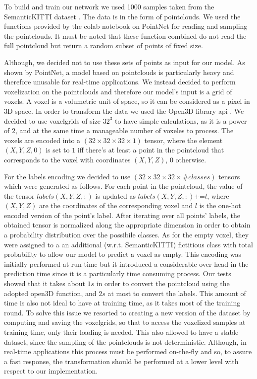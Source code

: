 To build and train our network we used 1000 samples taken from the SemanticKITTI dataset \cite{behley2019iccv}.
The data is in the form of pointclouds. We used the
functions provided by the colab notebook on PointNet for reading and sampling the pointclouds. It must be noted that these function combined
do not read the full pointcloud but return a random subset of points of fixed size.\par
Although, we decided not to use these sets of points as input for our model. As shown by PointNet,
a model based on pointclouds is particularly heavy and therefore unusable for real-time applications.
We instead decided to perform voxelization on the pointclouds and therefore our model's input is a grid of voxels.
A voxel is a volumetric unit of space, so it can be considered as a pixel in 3D space.
In order to transform the data we used the Open3D library api \cite{zhou2018open3d}. 
We decided to use voxelgrids of size $32^3$ to have simple calculations, as it is a power of $2$, and at the same time a manageable number of voxeles to process.
The voxels are encoded into a $(32\times32\times32\times1)$ tensor, where the element $(X,Y,Z,0)$ is set to $1$ iff there's at least a point in the pointcloud that corresponds to the voxel with coordinates $(X,Y,Z)$, 0 otherwise.\par
For the labels encoding we decided to use $(32\times32\times32\times\#classes)$ tensors which were generated as follows.
For each point in the pointcloud, the value of the tensor 
$labels(X,Y,Z,:)$ is updated as $labels(X,Y,Z,:)\textrm{+=}l$, where $(X,Y,Z)$ are the coordinates of the corresponding voxel and $l$ is the one-hot encoded version
of the point's label.
After iterating over all points' labels, the obtained tensor is normalized along the appropriate dimension in order to obtain a probability distribution over the possibile classes. 
As for the empty voxel, they were assigned to a an additional (w.r.t. SemanticKITTI) fictitious class with total probability to 
allow our model to predict a voxel as empty.
This encoding was initially performed at run-time but it introduced a considerable over-head in the prediction time since
it is a particularly time consuming process. Our tests showed that it takes about $1s$ in order to convert the pointcloud
using the adopted open3D function, and $2s$ at most to convert the labels. This amount of time
is also not ideal to have at training time, as it takes most of the training round. 
To solve this issue we resorted to creating a new version of the dataset by computing and saving the voxelgrids, so that to access the voxelized samples
at training time, only their loading is needed. This also allowed to have a stable dataset, since the sampling of the pointclouds
is not deterministic. Although, in real-time applications this process must be performed on-the-fly and so, to assure a fast response,
the transformation should be performed at a lower level with respect to our implementation.